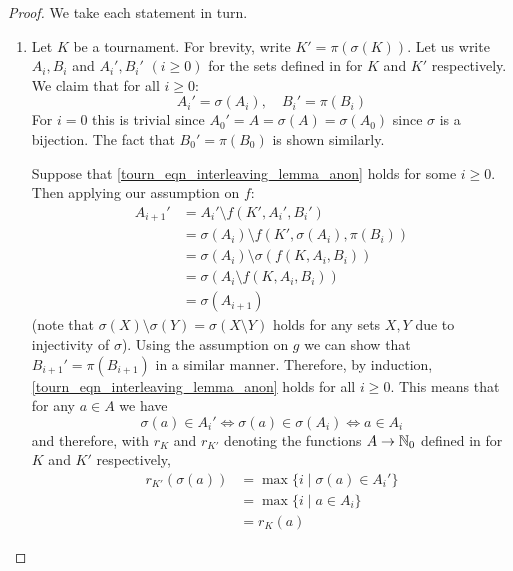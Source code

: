 \begin{proof}

    We take each statement in turn.

    \begin{enumerate}

    \item
    Let $K$ be a tournament. For brevity, write $K' = \pi(\sigma(K))$.  Let us
    write $A_i, B_i$ and $A_i', B_i'$ $(i \ge 0)$ for the sets defined in
     for $K$ and $K'$ respectively.  We claim that for
    all $i \ge 0$:
    \begin{equation}
        \label{tourn_eqn_interleaving_lemma_anon}
        A_i' = \sigma(A_i),
        \quad
        B_i' = \pi(B_i)
    \end{equation}
    For $i = 0$ this is trivial since $A_0' = A = \sigma(A) = \sigma(A_0)$
    since $\sigma$ is a bijection. The fact that $B_0' = \pi(B_0)$ is shown
    similarly.

    Suppose that \cref{tourn_eqn_interleaving_lemma_anon} holds for some $i \ge
    0$. Then applying our assumption on $f$:
    \begin{align*}
        A_{i+1}'
        &= A_i' \setminus f(K', A_i', B_i') \\
        &= \sigma(A_i) \setminus f(K', \sigma(A_i), \pi(B_i)) \\
        &= \sigma(A_i) \setminus \sigma(f(K, A_i, B_i)) \\
        &= \sigma(A_i \setminus f(K, A_i, B_i)) \\
        &= \sigma(A_{i+1})
    \end{align*}
    (note that $\sigma(X) \setminus \sigma(Y) = \sigma(X \setminus Y)$ holds
    for any sets $X, Y$ due to injectivity of $\sigma$). Using the assumption
    on $g$ we can show that $B_{i+1}' = \pi(B_{i+1})$ in a similar manner.
    Therefore, by induction, \cref{tourn_eqn_interleaving_lemma_anon} holds for
    all $i \ge 0$. This means that for any $a \in A$ we have
    \[
        \sigma(a) \in A_i'
        \iff
        \sigma(a) \in \sigma(A_i)
        \iff
        a \in A_i
    \]
    and therefore, with $r_K$ and $r_{K'}$ denoting the functions $A \to \mathbb{N}_0$
    defined in  for $K$ and $K'$ respectively,
    \begin{align*}
        r_{K'}(\sigma(a))
        &= \max\{i \mid \sigma(a) \in A_i'\} \\
        &= \max\{i \mid a \in A_i\} \\
        &= r_K(a)
    \end{align*}


\end{enumerate}
\end{proof}
